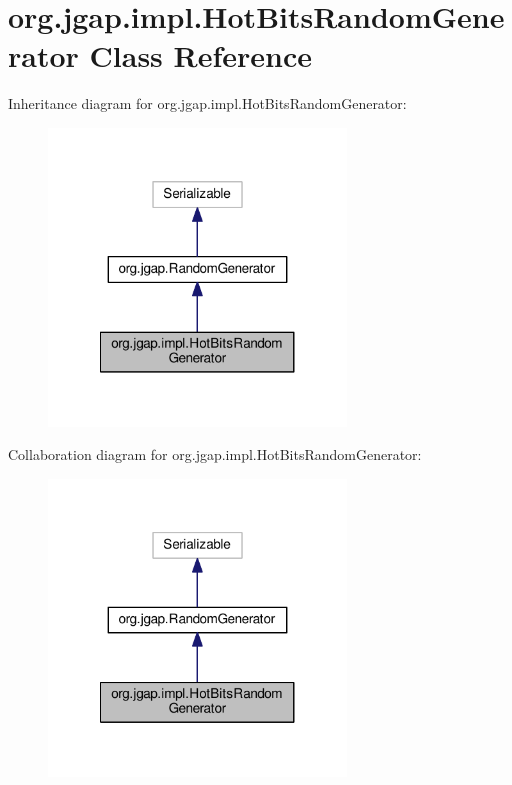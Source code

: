 \hypertarget{classorg_1_1jgap_1_1impl_1_1_hot_bits_random_generator}{\section{org.\-jgap.\-impl.\-Hot\-Bits\-Random\-Generator Class Reference}
\label{classorg_1_1jgap_1_1impl_1_1_hot_bits_random_generator}
}


Inheritance diagram for org.\-jgap.\-impl.\-Hot\-Bits\-Random\-Generator\-:
\nopagebreak
\begin{figure}[H]
\begin{center}
\leavevmode
\includegraphics[width=224pt]{classorg_1_1jgap_1_1impl_1_1_hot_bits_random_generator__inherit__graph}
\end{center}
\end{figure}


Collaboration diagram for org.\-jgap.\-impl.\-Hot\-Bits\-Random\-Generator\-:
\nopagebreak
\begin{figure}[H]
\begin{center}
\leavevmode
\includegraphics[width=224pt]{classorg_1_1jgap_1_1impl_1_1_hot_bits_random_generator__coll__graph}
\end{center}
\end{figure}
